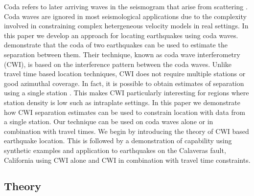 \documentclass[12pt,double]{article}
\begin{document}
Coda refers to  later arriving waves in the seismogram that arise
from scattering  \citep{dr_Aki69a,dr_Snieder99a,dr_Snieder06a}. Coda
waves are ignored in most seismological applications due to the
complexity involved in constraining complex hetergeneous velocity models
in real settings. In this paper we
develop an approach for locating earthquakes using coda waves.
\citet{dr_Snieder05a} demonstrate that the coda of two earthquakes
can be used to estimate the separation between them. Their
technique, known as coda wave interferometry (CWI), is based on the
interference pattern between the coda waves. Unlike travel time
based location techniques, CWI
 does not require multiple stations or good azimuthal coverage.
In fact, it is possible to obtain estimates of separation using a single
station \citep{dr_Robinson07b}. This makes CWI particularly interesting
for regions where station density is low such as intraplate settings. In this
paper we demonstrate how CWI separation estimates can be used to constrain
location with data from a single station.
Our technique can be used on coda waves alone or in combination with
travel times. We begin by introducing the theory of CWI based earthquake location. 
This is followed by a demonstration of capability using
synthetic examples and application to earthquakes
on the Calaveras fault, California using CWI alone
and CWI in combination with travel time constraints.

\vspace{2em}
\begin{centering}
\section*{Theory}
\end{centering}
\label{sec:theory}
\end{document}
